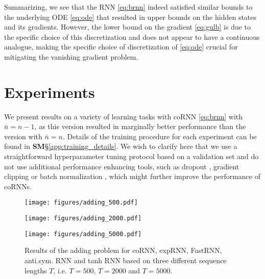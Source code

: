 \documentclass{article} \usepackage{iclr2021_conference,times}
\begin{document}
Summarizing, we see that the RNN \eqref{eq:brnn} indeed satisfied similar bounds to the underlying ODE \eqref{eq:ode} that resulted in upper bounds on the hidden states and its gradients. However, the lower bound on the gradient \eqref{eq:gulb} is due to the specific choice of this discretization and does not appear to have a continuous analogue, making the specific choice of discretization of \eqref{eq:ode} crucial for mitigating the vanishing gradient problem. 
\section{Experiments}
We present results on a variety of learning tasks with coRNN \eqref{eq:brnn} with $\bar{n} = n-1$, as this version resulted in marginally better performance than the version with $\bar{n}=n$. Details of the training procedure for each experiment can be found in {\bf SM}\S\ref{app:training_details}. We wish to clarify here that we use a straightforward hyperparameter tuning protocol based on a validation set and do not use additional performance enhancing tools, such as dropout \citep{dropout}, gradient clipping \citep{vanish_grad} or batch normalization \citep{batch_norm}, which might further improve the performance of coRNNs. 

\begin{figure}[ht!]
\begin{minipage}{.33\textwidth}
\texttt{[image: figures/adding\_500.pdf]}
\end{minipage}\begin{minipage}{.33\textwidth}
\texttt{[image: figures/adding\_2000.pdf]}
\end{minipage}\begin{minipage}{.33\textwidth}
\texttt{[image: figures/adding\_5000.pdf]}
\end{minipage}
\caption{Results of the adding problem for coRNN, expRNN, FastRNN, anti.sym. RNN and tanh RNN based on three different sequence lengths $T$, i.e. $T=500$, $T=2000$ and $T=5000$.}
\label{fig:adding_results}
\end{figure}
\end{document}
